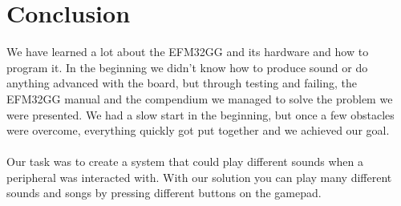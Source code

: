 \chapter{Conclusion}

We have learned a lot about the EFM32GG and its hardware and how to program it. In the beginning we didn't know how to produce sound or do anything advanced with the board, but through testing and failing, the EFM32GG manual\cite{efm32ggrm} and the compendium\cite{compendium} we managed to solve the problem we were presented. We had a slow start in the beginning, but once a few obstacles were overcome, everything quickly got put together and we achieved our goal. 
\\
\\
Our task was to create a system that could play different sounds when a peripheral was interacted with. With our solution you can play many different sounds and songs by pressing different buttons on the gamepad. 

